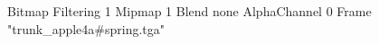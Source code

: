 {Bitmap
	{Filtering 1}
	{Mipmap 1}
	{Blend none}
	{AlphaChannel 0}
	{Frame "trunk_apple4a#spring.tga"}
}
